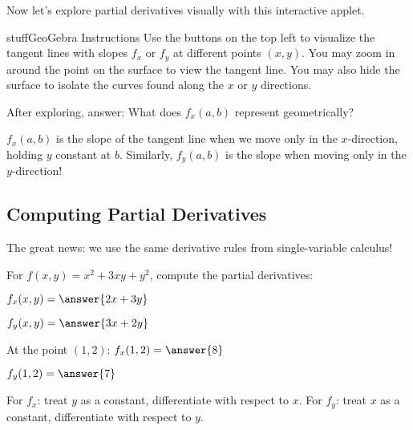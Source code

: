 \documentclass{ximera}
\begin{document}
\begin{problem}
Now let's explore partial derivatives visually with this interactive applet.

\begin{expandable}{stuff}{GeoGebra Instructions}
    Use the buttons on the top left to visualize the tangent lines with slopes $f_x$ or $f_y$ at different points $(x,y)$. You may zoom in around the point on the surface to view the tangent line. You may also hide the surface to isolate the curves found along the $x$ or $y$ directions.
\end{expandable}

\begin{center}
\end{center}

After exploring, answer: What does $f_x(a, b)$ represent geometrically?

\begin{multipleChoice}
\end{multipleChoice}

\begin{feedback}
$f_x(a,b)$ is the slope of the tangent line when we move only in the $x$-direction, holding $y$ constant at $b$. Similarly, $f_y(a,b)$ is the slope when moving only in the $y$-direction!
\end{feedback}
\end{problem}

\subsection*{Computing Partial Derivatives}

The great news: we use the same derivative rules from single-variable calculus!

\begin{problem}
For $f(x, y) = x^2 + 3xy + y^2$, compute the partial derivatives:

$f_x(x, y) = \answer{2x + 3y}$

$f_y(x, y) = \answer{3x + 2y}$

At the point $(1, 2)$:
$f_x(1, 2) = \answer{8}$

$f_y(1, 2) = \answer{7}$

\begin{feedback}
For $f_x$: treat $y$ as a constant, differentiate with respect to $x$.
For $f_y$: treat $x$ as a constant, differentiate with respect to $y$.
\end{feedback}
\end{problem}
\end{document}
